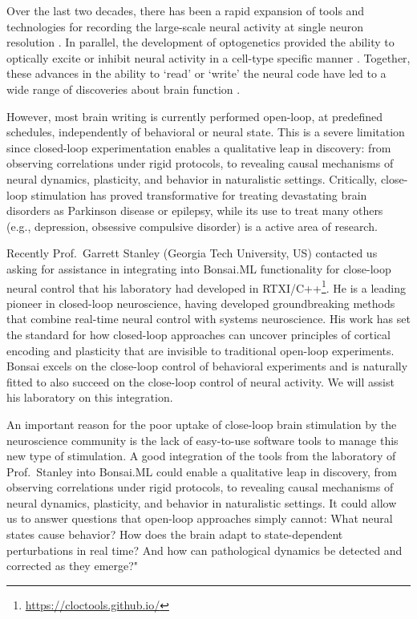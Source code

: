 Over the last two decades, there has been a rapid expansion of tools and
technologies for recording the large-scale neural activity at single neuron
resolution \citep{steinmetzEtAl21}. In parallel, the development
of optogenetics provided the ability to optically excite or inhibit neural
activity in a cell-type specific manner \citep{deisseroth14}. Together, these advances in
the ability to `read' or `write' the neural code have led to a wide range of
discoveries about brain function \citep{stanley13}.

However, most brain writing is currently performed open-loop, at predefined
schedules, independently of behavioral or neural state. This is a severe
limitation since closed-loop experimentation enables a qualitative leap in
discovery: from observing correlations under rigid protocols, to revealing
causal mechanisms of neural dynamics, plasticity, and behavior in naturalistic
settings. Critically, close-loop stimulation has proved transformative for
treating devastating brain disorders as Parkinson disease or epilepsy, while
its use to treat many others (e.g., depression, obsessive compulsive disorder)
is a active area of research.

Recently Prof.~Garrett Stanley (Georgia Tech University, US) contacted us
asking for assistance in integrating into Bonsai.ML functionality for
close-loop neural control that his laboratory had developed in
RTXI/C++\footnote[6]{\url{https://cloctools.github.io/}}.
%
He is a leading pioneer in closed-loop neuroscience, having developed
groundbreaking methods that combine real-time neural control with systems
neuroscience. His work has set the standard for how closed-loop approaches can
uncover principles of cortical encoding and plasticity that are invisible to
traditional open-loop experiments.
%
Bonsai excels on the close-loop control of behavioral experiments and is
naturally fitted to also succeed on the close-loop control of neural activity.
%
We will assist his laboratory on this integration.

An important reason for the poor uptake of close-loop brain stimulation by the
neuroscience community is the lack of easy-to-use software tools to manage this
new type of stimulation.
%
A good integration of the tools from the laboratory of Prof.~Stanley into
Bonsai.ML could enable a qualitative leap in discovery, from observing
correlations under rigid protocols, to revealing causal mechanisms of neural
dynamics, plasticity, and behavior in naturalistic settings.
%
It could allow us to answer questions that open-loop approaches simply cannot:
What neural states cause behavior? How does the brain adapt to state-dependent
perturbations in real time? And how can pathological dynamics be detected and
corrected as they emerge?"

